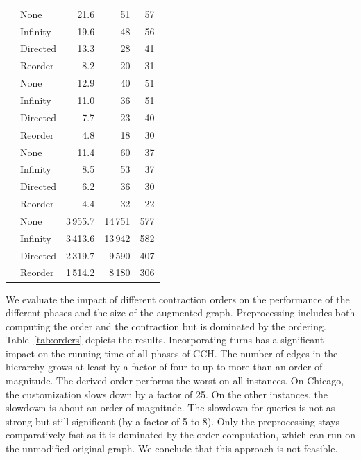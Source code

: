 \documentclass[a4paper, english, cleveref]{lipics-v2021}
\begin{document}
\begin{table}[tb]
{\begin{tabular}{llrrr}
& None &           21.6 &                              51 &              57 \\
& Infinity &           19.6 &                              48 &              56 \\
& Directed &           13.3 &                              28 &              41 \\
& Reorder &            8.2 &                              20 &              31 \\
\addlinespace
\parbox[t]{3mm}{}
& None &           12.9 &                              40 &              51 \\
& Infinity &           11.0 &                              36 &              51 \\
& Directed &            7.7 &                              23 &              40 \\
& Reorder &            4.8 &                              18 &              30 \\
\addlinespace
\parbox[t]{3mm}{}
& None &           11.4 &                              60 &              37 \\
& Infinity &            8.5 &                              53 &              37 \\
& Directed &            6.2 &                              36 &              30 \\
& Reorder &            4.4 &                              32 &              22 \\
\addlinespace
\parbox[t]{3mm}{}
& None &         3\,955.7 &                           14\,751 &             577 \\
& Infinity &         3\,413.6 &                           13\,942 &             582 \\
& Directed &         2\,319.7 &                            9\,590 &             407 \\
& Reorder &         1\,514.2 &                            8\,180 &             306 \\
\bottomrule
\end{tabular}
}
\end{table}

We evaluate the impact of different contraction orders on the performance of the different phases and the size of the augmented graph.
Preprocessing includes both computing the order and the contraction but is dominated by the ordering.
Table~\ref{tab:orders} depicts the results.
Incorporating turns has a significant impact on the running time of all phases of CCH.
The number of edges in the hierarchy grows at least by a factor of four to up to more than an order of magnitude.
The derived order performs the worst on all instances.
On Chicago, the customization slows down by a factor of 25.
On the other instances, the slowdown is about an order of magnitude.
The slowdown for queries is not as strong but still significant (by a factor of 5 to 8).
Only the preprocessing stays comparatively fast as it is dominated by the order computation, which can run on the unmodified original graph.
We conclude that this approach is not feasible.
\end{document}
